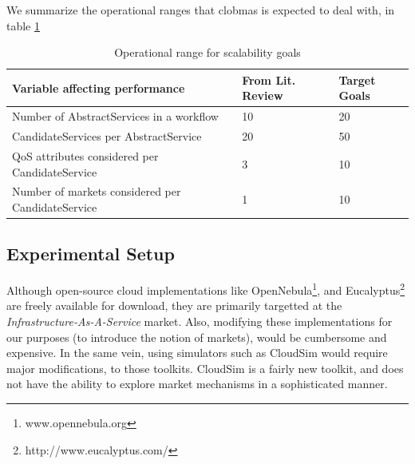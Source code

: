\documentclass[10pt,journal,compsoc]{IEEEtran}
\begin{document}
We summarize the operational ranges that clobmas is expected to deal with, in table \ref{tbl:scalability_targets}
\begin{table}[h]
\centering
\renewcommand{\arraystretch}{1.5}
\begin{tabular}{p{10cm}p{4cm}p{3cm}}
	\toprule
	\textbf{Variable affecting performance} & \textbf{From Lit. Review} & \textbf{Target Goals}\\ 
	\midrule
	Number of AbstractServices in a workflow & \hspace{1.8cm} 10 & \hspace{1.5cm} 20 \\ 
	CandidateServices per AbstractService & \hspace{1.8cm} 20 & \hspace{1.5cm} 50 \\ 
	QoS attributes considered per CandidateService & \hspace{1.8cm} 3 & \hspace{1.5cm} 10 \\ 
	Number of markets considered per CandidateService & \hspace{1.8cm} 1 & \hspace{1.5cm} 10 \\ 
	\bottomrule
\end{tabular}
\caption{Operational range for scalability goals \label{tbl:scalability_targets}}
\end{table}

\subsection{Experimental Setup}
Although open-source cloud implementations like OpenNebula\footnote{www.opennebula.org}, and Eucalyptus\footnote{http://www.eucalyptus.com/} are freely available for download, they are primarily targetted at the \textit{Infrastructure-As-A-Service} market. Also, modifying these implementations for our purposes (to introduce the notion of markets), would be cumbersome and expensive. In the same vein, using simulators such as CloudSim would require major modifications, to those toolkits. CloudSim is a fairly new toolkit, and does not have the ability to explore market mechanisms in a sophisticated manner\cite{Breskovic2011Towards}. 
\end{document}
